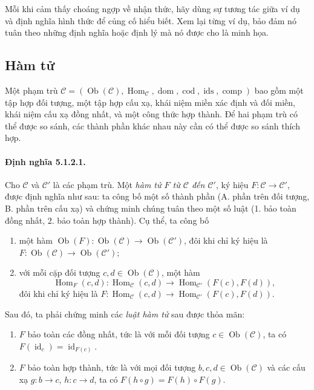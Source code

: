 Mỗi khi cảm thấy choáng ngợp về nhận thức, hãy dùng sự tương tác giữa ví dụ và định nghĩa hình thức để củng cố hiểu biết. Xem lại từng ví dụ, bảo đảm nó tuân theo những định nghĩa hoặc định lý mà nó được cho là minh họa.
\subsection{Hàm tử}
Một phạm trù $\mathcal C=(\operatorname{Ob}(\mathcal C),\operatorname{Hom}_{\mathcal C},\operatorname{dom},\operatorname{cod},\operatorname{ids},\operatorname{comp})$ bao gồm một tập hợp đối tượng, một tập hợp cấu xạ, khái niệm miền xác định và đối miền, khái niệm cấu xạ đồng nhất, và
một công thức hợp thành. Để hai phạm trù có thể được so sánh, các thành phần khác nhau này cần có thể được so sánh thích hợp.
\paragraph{Định nghĩa 5.1.2.1.} Cho $\mathcal C$ và $\mathcal C'$ là các phạm trù. Một \emph{hàm tử $F$ từ $\mathcal C$ đến $\mathcal C'$}, ký hiệu $F:\mathcal C\to\mathcal C'$, được định nghĩa như sau: ta công bố một số thành phần (A. phần trên đối tượng, B. phần trên cấu xạ) và chứng minh chúng tuân theo một số luật (1. bảo toàn đồng nhất, 2. bảo toàn hợp thành). Cụ thể, ta công bố
\begin{enumerate}[label=\Alph*.]
\item một hàm $\operatorname{Ob}(F):\operatorname{Ob}(\mathcal C)\to\operatorname{Ob}(\mathcal C')$, đôi khi chỉ ký hiệu là $F:\operatorname{Ob}(\mathcal C)\to\operatorname{Ob}(\mathcal C')$;
\item với mỗi cặp đối tượng $c,d\in\operatorname{Ob}(\mathcal C)$, một hàm
\[\operatorname{Hom}_F(c,d):\operatorname{Hom}_{\mathcal C}(c,d)\longrightarrow\operatorname{Hom}_{\mathcal C'}(F(c),F(d)),\]
đôi khi chỉ ký hiệu là $F:\operatorname{Hom}_{\mathcal C}(c,d)\to\operatorname{Hom}_{\mathcal C'}(F(c),F(d))$.
\end{enumerate}
Sau đó, ta phải chứng minh các \emph{luật hàm tử} sau được thỏa mãn:
\begin{enumerate}
\item $F$ bảo toàn các đồng nhất, tức là với mỗi đối tượng $c\in\operatorname{Ob}(\mathcal C)$, ta có $F(\operatorname{id}_c)=\operatorname{id}_{F(c)}$.
\item $F$ bảo toàn hợp thành, tức là với mọi đối tượng $b,c,d\in\operatorname{Ob}(\mathcal C)$ và các cấu xạ $g:b\to c$, $h:c\to d$, ta có $F(h\circ g)=F(h)\circ F(g)$.
\end{enumerate}
